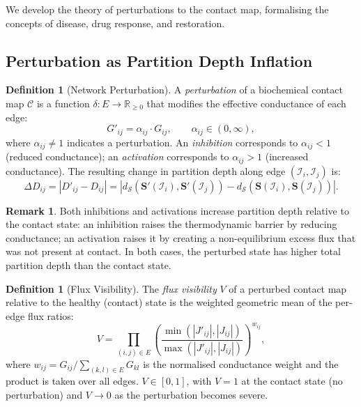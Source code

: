 \documentclass[11pt,twocolumn]{article}
\theoremstyle{plain}
\theoremstyle{definition}
\newtheorem{definition}[theorem]{Definition}
\newtheorem{remark}[theorem]{Remark}
\newcommand{\CC}{\mathcal{C}}
\newcommand{\bS}{\mathbf{S}}
\newcommand{\dS}{d_{\mathcal{S}}}
\newcommand{\reals}{\mathbb{R}}
\begin{document}
We develop the theory of perturbations to the contact map, formalising the
concepts of disease, drug response, and restoration.

\subsection{Perturbation as Partition Depth Inflation}

\begin{definition}[Network Perturbation]
\label{def:perturbation}
A \emph{perturbation} of a biochemical contact map $\CC$ is a function
$\delta: E \to \reals_{\geq 0}$ that modifies the effective conductance of each
edge:
\begin{equation}\label{eq:perturb}
  G'_{ij} = \alpha_{ij} \cdot G_{ij},
  \qquad \alpha_{ij} \in (0, \infty),
\end{equation}
where $\alpha_{ij} \neq 1$ indicates a perturbation. An \emph{inhibition}
corresponds to $\alpha_{ij} < 1$ (reduced conductance); an \emph{activation}
corresponds to $\alpha_{ij} > 1$ (increased conductance). The resulting
change in partition depth along edge $(\mathcal{I}_i, \mathcal{I}_j)$ is:
\begin{equation}\label{eq:depth_change}
  \Delta D_{ij} = |D'_{ij} - D_{ij}|
  = |\dS(\bS'(\mathcal{I}_i), \bS'(\mathcal{I}_j))
    - \dS(\bS(\mathcal{I}_i), \bS(\mathcal{I}_j))|.
\end{equation}
\end{definition}

\begin{remark}
Both inhibitions and activations increase partition depth relative to the
contact state: an inhibition raises the thermodynamic barrier by reducing
conductance; an activation raises it by creating a non-equilibrium excess flux
that was not present at contact. In both cases, the perturbed state has higher
total partition depth than the contact state.
\end{remark}

\begin{definition}[Flux Visibility]
\label{def:visibility}
The \emph{flux visibility} $V$ of a perturbed contact map relative to the
healthy (contact) state is the weighted geometric mean of the per-edge flux
ratios:
\begin{equation}\label{eq:visibility}
  V = \prod_{(i,j) \in E}
    \left(\frac{\min(|J'_{ij}|, |J_{ij}|)}{\max(|J'_{ij}|, |J_{ij}|)}\right)^{w_{ij}},
\end{equation}
where $w_{ij} = G_{ij} / \sum_{(k,l) \in E} G_{kl}$ is the normalised
conductance weight and the product is taken over all edges. $V \in [0, 1]$,
with $V = 1$ at the contact state (no perturbation) and $V \to 0$ as the
perturbation becomes severe.
\end{definition}
\end{document}
